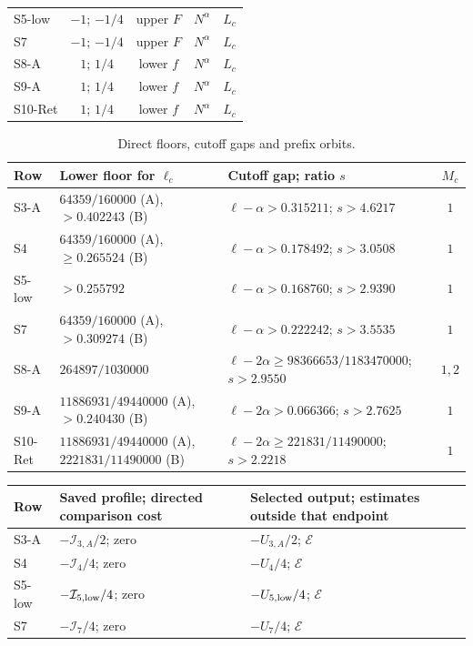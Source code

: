 \begin{lemma}
\begin{center}
\begin{tabular}{@{}lccll@{}}
S5-low & $-1$; $-1/4$ & upper $F$ & $N^\alpha$ & $L_c$\\
S7 & $-1$; $-1/4$ & upper $F$ & $N^\alpha$ & $L_c$\\
S8-A & $1$; $1/4$ & lower $f$ & $N^\alpha$ & $L_c$\\
S9-A & $1$; $1/4$ & lower $f$ & $N^\alpha$ & $L_c$\\
S10-Ret & $1$; $1/4$ & lower $f$ & $N^\alpha$ & $L_c$\\\bottomrule
\end{tabular}
\end{center}
\begin{table}[htbp]
\caption{Direct floors, cutoff gaps and prefix orbits.}\label{tab:direct-parameters}
\small
\begin{tabularx}{\textwidth}{@{}lXXc@{}}\toprule
Row & Lower floor for $\ell_c$ & Cutoff gap; ratio $s$ & $M_c$\\\midrule
S3-A & $64359/160000$ (A), $>0.402243$ (B)
 & $\ell-\alpha>0.315211$; $s>4.6217$ & $1$\\
S4 & $64359/160000$ (A), $\ge0.265524$ (B)
 & $\ell-\alpha>0.178492$; $s>3.0508$ & $1$\\
S5-low & $>0.255792$
 & $\ell-\alpha>0.168760$; $s>2.9390$ & $1$\\
S7 & $64359/160000$ (A), $>0.309274$ (B)
 & $\ell-\alpha>0.222242$; $s>3.5535$ & $1$\\
S8-A & $264897/1030000$
 & $\ell-2\alpha\ge98366653/1183470000$; $s>2.9550$ & $1,2$\\
S9-A & $11886931/49440000$ (A), $>0.240430$ (B)
 & $\ell-2\alpha>0.066366$; $s>2.7625$ & $1$\\
S10-Ret & $11886931/49440000$ (A), $2221831/11490000$ (B)
 & $\ell-2\alpha\ge221831/11490000$; $s>2.2218$ & $1$\\\bottomrule
\end{tabularx}
\end{table}
\begin{center}
\begin{tabularx}{\textwidth}{@{}lXX@{}}\toprule
Row & Saved profile; directed comparison cost & Selected output; estimates outside that endpoint\\\midrule
S3-A & $-\mathcal I_{3,A}/2$; zero & $-U_{3,A}/2$; $\mathcal E$\\
S4 & $-\mathcal I_4/4$; zero & $-U_4/4$; $\mathcal E$\\
S5-low & $-\mathcal I_{5,\rm low}/4$; zero & $-U_{5,\rm low}/4$; $\mathcal E$\\
S7 & $-\mathcal I_7/4$; zero & $-U_7/4$; $\mathcal E$\\

\end{tabularx}
\end{center}
\end{lemma}
